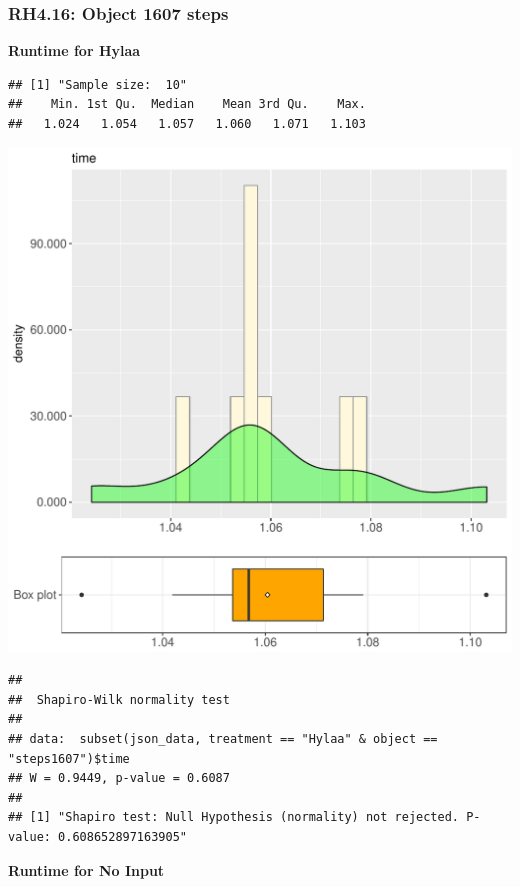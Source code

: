 \documentclass{article}\usepackage[]{graphicx}\usepackage[]{color}
\makeatletter
\def\maxwidth{ %
  \ifdim\Gin@nat@width>\linewidth
    \linewidth
  \else
    \Gin@nat@width
  \fi
}
\newenvironment{kframe}{%
 \def\at@end@of@kframe{}%
 \ifinner\ifhmode%
  \def\at@end@of@kframe{\end{minipage}}%
  \begin{minipage}{\columnwidth}%
 \fi\fi%
 \def\FrameCommand##1{\hskip\@totalleftmargin \hskip-\fboxsep
 \colorbox{shadecolor}{##1}\hskip-\fboxsep
     \hskip-\linewidth \hskip-\@totalleftmargin \hskip\columnwidth}%
 \MakeFramed {\advance\hsize-\width
   \@totalleftmargin\z@ \linewidth\hsize
   \@setminipage}}%
 {\par\unskip\endMakeFramed%
 \at@end@of@kframe}
\newenvironment{knitrout}{}{} %
\makeatother
\begin{document}
\subsubsection{RH4.16: Object 1607 steps}

 \textbf{Runtime for Hylaa}
\begin{knitrout}
\color{fgcolor}\begin{kframe}
\begin{verbatim}
## [1] "Sample size:  10"
##    Min. 1st Qu.  Median    Mean 3rd Qu.    Max. 
##   1.024   1.054   1.057   1.060   1.071   1.103
\end{verbatim}
\end{kframe}
\includegraphics[width=\maxwidth]{figure/RH4_Hylaa_steps1607-1} 
\begin{kframe}\begin{verbatim}
## 
## 	Shapiro-Wilk normality test
## 
## data:  subset(json_data, treatment == "Hylaa" & object == "steps1607")$time
## W = 0.9449, p-value = 0.6087
## 
## [1] "Shapiro test: Null Hypothesis (normality) not rejected. P-value: 0.608652897163905"
\end{verbatim}
\end{kframe}
\end{knitrout}
 \textbf{Runtime for No Input}
\end{document}

